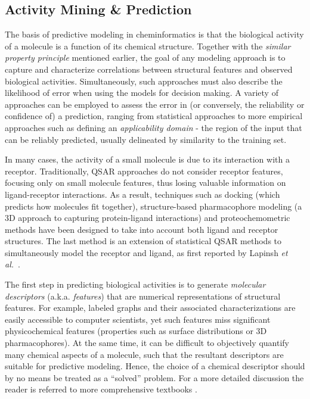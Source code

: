 \documentclass{sig-alternate}
\begin{document}
\subsection{Activity Mining \& Prediction}
\label{sec:activity-mining}


The basis of predictive modeling in cheminformatics is that the
biological activity of a molecule is a function of its chemical
structure. Together with the \emph{similar property principle}
\cite{Johnson:1990qf} mentioned earlier,
the goal of any modeling approach is to capture
and characterize correlations between structural features and
observed biological activities. Simultaneously, such approaches must
also describe the likelihood of error when using the
models for decision making.  A variety of approaches can be employed
to assess the error in (or conversely, the reliability or confidence of) a
prediction, ranging from statistical approaches to more
empirical approaches such as defining an \emph{applicability domain} -
the region of the input that can be
reliably predicted, usually delineated by similarity
to the training set.

In many cases, the activity of a small molecule is due to its
interaction with a receptor. Traditionally, QSAR \cite{Hansch:1962vn,
  Free:1964ys} approaches do not consider receptor features, focusing
only on small molecule features, thus losing valuable information on
ligand-receptor interactions. As a result, techniques such as docking
(which predicts how molecules fit together), structure-based
pharmacophore modeling (a 3D approach to capturing protein-ligand
interactions) and proteochemometric methods have been designed to take
into account both ligand and receptor structures. The last method is
an extension of statistical QSAR methods to simultaneously model the
receptor and ligand, as first reported by Lapinsh \textit{et
  al.}~\cite{lapinsh2001}.

The first step in predicting biological activities is to generate
\emph{molecular descriptors} (a.k.a. \emph{features}) that are
numerical representations of structural features. For example, labeled
graphs and their associated characterizations are easily accessible to
computer scientists, yet such features miss significant
physicochemical features (properties such as surface distributions or
3D pharmacophores). At the same time, it can be difficult to
objectively quantify many chemical aspects of a molecule, such that
the resultant descriptors are suitable for predictive modeling.
Hence, the choice of a chemical descriptor should by no means be
treated as a ``solved'' problem. For a more detailed discussion the
reader is referred to more comprehensive textbooks
\cite{todeschini2000,faulon2010}.
\end{document}
